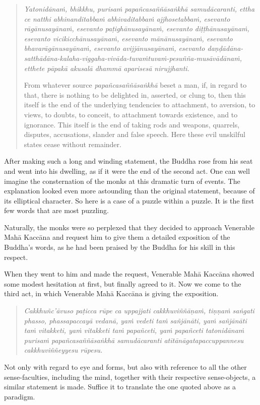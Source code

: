 \begin{quote}
\emph{Yatonidānaṁ, bhikkhu, purisaṁ papañcasaññāsaṅkhā samudācaranti, ettha ce natthi abhinanditabbaṁ abhivaditabbaṁ ajjhosetabbaṁ, esevanto rāgānusayānaṁ, esevanto paṭighānusayānaṁ, esevanto diṭṭhānusayānaṁ, esevanto vicikicchānusayānaṁ, esevanto mānānusayānaṁ, esevanto bhavarāgānusayānaṁ, esevanto avijjānusayānaṁ, esevanto daṇḍādāna-satthādāna-kalaha-viggaha-vivāda-tuvaṁtuvaṁ-pesuñña-musāvādānaṁ, etthete pāpakā akusalā dhammā aparisesā nirujjhanti.}

From whatever source \emph{papañcasaññāsaṅkhā} beset a man, if, in regard to that, there is nothing to be delighted in, asserted, or clung to, then this itself is the end of the underlying tendencies to attachment, to aversion, to views, to doubts, to conceit, to attachment towards existence, and to ignorance. This itself is the end of taking rods and weapons, quarrels, disputes, accusations, slander and false speech. Here these evil unskilful states cease without remainder.
\end{quote}

After making such a long and winding statement, the Buddha rose from his seat and went into his dwelling, as if it were the end of the second act. One can well imagine the consternation of the monks at this dramatic turn of events. The explanation looked even more astounding than the original statement, because of its elliptical character. So here is a case of a puzzle within a puzzle. It is the first few words that are most puzzling.

Naturally, the monks were so perplexed that they decided to approach Venerable Mahā Kaccāna and request him to give them a detailed exposition of the Buddha's words, as he had been praised by the Buddha for his skill in this respect.

When they went to him and made the request, Venerable Mahā Kaccāna showed some modest hesitation at first, but finally agreed to it. Now we come to the third act, in which Venerable Mahā Kaccāna is giving the exposition.

\begin{quote}
\emph{Cakkhuñc'āvuso paṭicca rūpe ca uppajjati cakkhuviññāṇaṁ, tiṇṇaṁ saṅgati phasso, phassapaccayā vedanā, yaṁ vedeti taṁ sañjānāti, yaṁ sañjānāti taṁ vitakketi, yaṁ vitakketi taṁ papañceti, yaṁ papañceti tatonidānaṁ purisaṁ papañcasaññāsaṅkhā samudācaranti atītānāgatapaccuppannesu cakkhuviññeyyesu rūpesu.}
\end{quote}

Not only with regard to eye and forms, but also with reference to all the other sense-faculties, including the mind, together with their respective sense-objects, a similar statement is made. Suffice it to translate the one quoted above as a paradigm.

